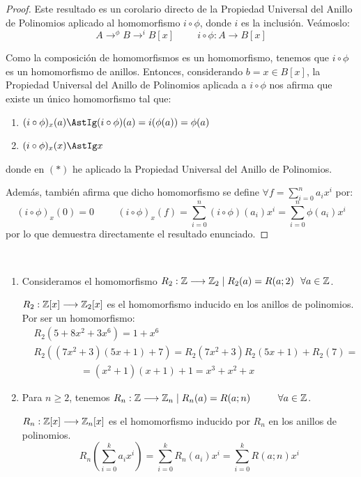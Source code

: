 \begin{proof}
    Este resultado es un corolario directo de la Propiedad Universal del Anillo de Polinomios aplicado al homomorfismo $i\circ \phi$, donde $i$ es la inclusión. Veámoslo:
    $$A \mathop{\longrightarrow}^{\phi} B \mathop{\longrightarrow}^i B[x] \hspace{1cm} i \circ \phi:A\longrightarrow B[x]$$

    Como la composición de homomorfismos es un homomorfismo, tenemos que $i \circ \phi$ es un homomorfismo de anillos. Entonces, considerando $b = x \in B[x]$, la Propiedad Universal del Anillo de Polinomios aplicada a $i \circ \phi$ nos afirma que existe un único homomorfismo tal que:
    \begin{enumerate}
        \item $(i\circ \phi)_x(a) \AstIg (i\circ \phi)(a) = i(\phi(a))=\phi(a)$
        \item $(i\circ \phi)_x(x) \AstIg x$
    \end{enumerate}
    donde en $(\ast)$ he aplicado la Propiedad Universal del Anillo de Polinomios.

    Además, también afirma que dicho homomorfismo se define $\forall f=\sum_{i=0}^n a_ix^i$ por:
    \begin{equation*}
        (i\circ \phi)_x(0) = 0 \hspace{1cm}
        (i\circ \phi)_x(f) = \sum_{i=0}^n (i\circ \phi)(a_i)x^i = \sum_{i=0}^n \phi(a_i)x^i
    \end{equation*}
    por lo que demuestra directamente el resultado enunciado.
\end{proof}

\begin{ejemplo}\
    \begin{enumerate}
        \item Consideramos el homomorfismo $R_2:\mathbb Z\longrightarrow \mathbb Z_2 \mid R_2(a) = R(a;2)~~\forall a \in \mathbb Z$.
        
        $R_2:\mathbb Z[x]\longrightarrow \mathbb Z_2[x]$ es el homomorfismo inducido en los anillos de polinomios. Por ser un homomorfismo:
        \begin{equation*}
            \begin{split}
                &R_2(5+8x^2 + 3x^6) = 1 + x^6 \\
                &R_2((7x^2+3)(5x+1)+7) = R_2(7x^2+3)R_2(5x+1)+R_2(7) = \\
                & \hspace{2cm} = (x^2+1)(x+1)+1 = x^3+x^2+x
            \end{split}
        \end{equation*}

        \item Para $n \geq 2$, tenemos $R_n:\mathbb Z\longrightarrow \mathbb Z_n \mid R_n(a) = R(a;n) \hspace{1cm} \forall a \in \mathbb Z$.
        
        $R_n:\mathbb Z[x]\longrightarrow \mathbb Z_n[x]$ es el homomorfismo inducido por $R_n$ en los anillos de polinomios.
        $$R_n\left( \sum_{i=0}^k a_ix^i \right) = \sum_{i=0}^k R_n(a_i)x^i = \sum_{i=0}^k R(a;n)x^i$$
    \end{enumerate}
\end{ejemplo}
